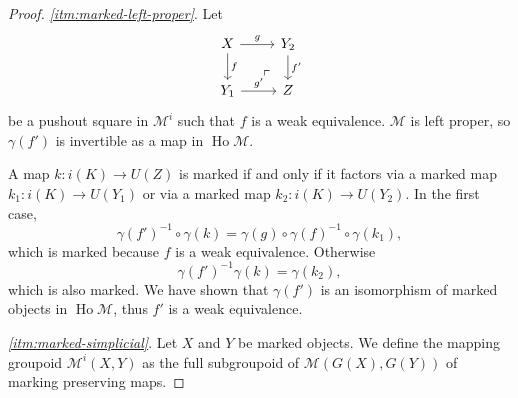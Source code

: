\documentclass[a4paper]{article}
\theoremstyle{remark}
\theoremstyle{definition}
\begin{document}
\begin{proof}
  \emph{\ref{itm:marked-left-proper}}.
  Let 
  \begin{equation}
    \begin{tikzcd}
      X \arrow[r, "g"] \arrow[d, "f"] \arrow[dr, phantom, near end, "\ulcorner"] & Y_2 \arrow[d, "f'"] \\
      Y_1 \arrow[r, "g'"] & Z
    \end{tikzcd}
  \end{equation}
  be a pushout square in $\mathcal{M}^i$ such that $f$ is a weak equivalence.
  $\mathcal{M}$ is left proper, so $\gamma(f')$ is invertible as a map in $\operatorname{Ho} \mathcal{M}$.

  A map $k : i(K) \rightarrow U(Z)$ is marked if and only if it factors via a marked map $k_1 : i(K) \rightarrow U(Y_1)$ or via a marked map $k_2 : i(K) \rightarrow U(Y_2)$.
  In the first case,
  \begin{equation}
    \gamma(f')^{-1} \circ \gamma(k) = \gamma(g) \circ \gamma(f)^{-1} \circ \gamma(k_1),
  \end{equation}
  which is marked because $f$ is a weak equivalence.
  Otherwise
  \begin{equation}
    \gamma(f')^{-1} \gamma(k) = \gamma(k_2),
  \end{equation}
  which is also marked.
  We have shown that $\gamma(f')$ is an isomorphism of marked objects in $\operatorname{Ho} \mathcal{M}$, thus $f'$ is a weak equivalence.

  \emph{\ref{itm:marked-simplicial}}.
  Let $X$ and $Y$ be marked objects.
  We define the mapping groupoid $\mathcal{M}^i(X, Y)$ as the full subgroupoid of $\mathcal{M}(G(X), G(Y))$ of marking preserving maps.


\end{proof}
\end{document}
